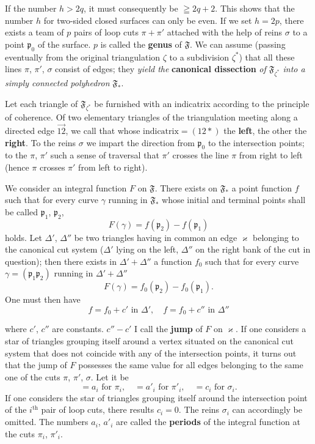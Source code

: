 \documentclass{article}
\begin{document}

If the number $h > 2q$, it must consequently be $\geqq 2q + 2$. This shows that the number $h$ for two-sided closed surfaces can only be even. If we set $h = 2p$, there exists a team of $p$ pairs of loop cuts $\pi + \pi'$ attached with the help of reins $\sigma$ to a point $\mathfrak{p}_0$ of the surface. $p$ is called the \textbf{genus} of $\mathfrak{F}$. We can assume (passing eventually from the original triangulation $\zeta$ to a subdivision $\zeta^*$) that all these lines $\pi$, $\pi'$, $\sigma$ consist of edges; they \emph{yield the} \textbf{canonical dissection} \emph{of $\mathfrak{F}_{\zeta^*}$ into a simply connected polyhedron} $\mathfrak{F}_*$.

Let each triangle of $\mathfrak{F}_{\zeta^*}$ be furnished with an indicatrix according to the principle of coherence. Of two elementary triangles of the triangulation meeting along a directed edge $\overrightarrow{12}$, we call that whose $\text{indicatrix} = (12*)$ the \textbf{left}, the other the \textbf{right}. To the reins $\sigma$ we impart the direction from $\mathfrak{p}_0$ to the intersection points; to the $\pi$, $\pi'$ such a sense of traversal that $\pi'$ crosses the line $\pi$ from right to left (hence $\pi$ crosses $\pi'$ from left to right).

We consider an integral function $F$ on $\mathfrak{F}$. There exists on $\mathfrak{F}_*$ a point function $f$ such that for every curve $\gamma$ running in $\mathfrak{F}_*$ whose initial and terminal points shall be called $\mathfrak{p}_1$, $\mathfrak{p}_2$,
\[ F(\gamma) = f(\mathfrak{p}_2) - f(\mathfrak{p}_1) \]
holds. Let $\Delta'$, $\Delta''$ be two triangles having in common an edge $\varkappa$ belonging to the canonical cut system ($\Delta'$ lying on the left, $\Delta''$ on the right bank of the cut in question); then there exists in $\Delta' + \Delta''$ a function $f_0$ such that for every curve $\gamma = (\mathfrak{p}_1 \mathfrak{p}_2)$ running in $\Delta' + \Delta''$
\[ F(\gamma) = f_0(\mathfrak{p}_2) - f_0(\mathfrak{p}_1). \]
One must then have
\[ f = f_0 + c' \text{ in } \Delta', \quad f = f_0 + c'' \text{ in } \Delta'' \]

where $c'$, $c''$ are constants. $c'' - c'$ I call the \textbf{jump} of $F$ on $\varkappa$. If one considers a star of triangles grouping itself around a vertex situated on the canonical cut system that does not coincide with any of the intersection points, it turns out that the jump of $F$ possesses the same value for all edges belonging to the same one of the cuts $\pi$, $\pi'$, $\sigma$. Let it be
\[ = a_i \text{ for } \pi_i, \quad = a'_i \text{ for } \pi'_i, \quad = c_i \text{ for } \sigma_i. \]
If one considers the star of triangles grouping itself around the intersection point of the $i^{\text{th}}$ pair of loop cuts, there results $c_i = 0$. The reins $\sigma_i$ can accordingly be omitted. The numbers $a_i$, $a'_i$ are called the \textbf{periods} of the integral function at the cuts $\pi_i$, $\pi'_i$.
\end{document}
